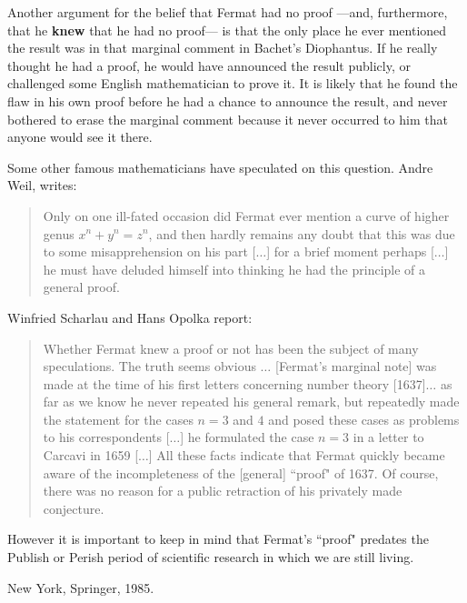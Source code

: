  Another argument for the belief that Fermat had no proof ---and,
 furthermore, that he {\bf knew} that he had no proof--- is that the
only place he ever mentioned the result was in that marginal comment in
Bachet's Diophantus. If he really thought he had a proof, he would have
announced the result publicly, or challenged some English mathematician
to prove it. It is likely that he found the flaw in his own proof before
he had a chance to announce the result, and never bothered to erase the
marginal comment because it never occurred to him that anyone would see
it there.

Some other famous mathematicians have speculated on this question.
Andre Weil, writes:
\begin{quote}
Only on one ill-fated occasion did Fermat ever mention
a curve of higher genus $x^n+y^n=z^n$, and then hardly remains any
doubt that this was due to some misapprehension on his part [$\ldots$]
 for a brief moment perhaps [$\ldots$] he must have deluded himself
into thinking he had the principle of a general proof.
\end{quote}

Winfried Scharlau and Hans Opolka report:
\begin{quote}
Whether
Fermat knew a proof or not has been the subject of many speculations.  The
truth seems obvious $\ldots$ [Fermat's marginal note] was made at the time of his
first letters concerning number theory [1637]$\ldots$ as far as we know he never
repeated his general remark, but repeatedly made the statement for the
cases $n=3$ and $4$ and posed these cases as problems to his correspondents
[$\ldots$] he formulated the case $n=3$ in a letter to Carcavi in 1659
[$\ldots$]  All these
facts indicate that Fermat quickly became aware of the incompleteness of
the [general] ``proof" of 1637.  Of course, there was no reason for a public
retraction of his privately made conjecture.
\end{quote}



However it is important to keep in mind that Fermat's ``proof"
 predates the Publish or
Perish period of scientific research in which we are still living.


\Ref

{New York, Springer, 1985.}











